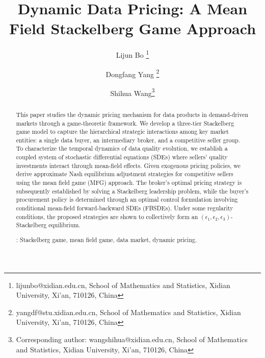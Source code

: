 \documentclass[11pt]{article}
\numberwithin{equation}{section}
\begin{document}
	
	\title{Dynamic Data Pricing: A Mean Field Stackelberg Game Approach}
	
	\author{
		Lijun Bo
		\thanks{lijunbo@xidian.edu.cn, School of Mathematics and Statistics, 
    Xidian University, Xi'an, 710126, China}
		\and
		Dongfang Yang
		\thanks{yangdf@stu.xidian.edu.cn, School of Mathematics and Statistics, 
    Xidian University, Xi'an, 710126, China}
		\and
		Shihua Wang\thanks{Corresponding author: wangshihua@xidian.edu.cn, School of Mathematics and Statistics, Xidian University, Xi'an, 710126, China}	
	}
	
	\date{}
	
	\maketitle
	
	\begin{abstract}
This paper studies the dynamic pricing mechanism for data products in demand-driven markets through a game-theoretic framework. We develop a three-tier Stackelberg game model to capture the hierarchical strategic interactions among key market entities: a single data buyer, an intermediary broker, and a competitive seller group. To characterize the temporal dynamics of data quality evolution, we establish a coupled system of stochastic differential equations (SDEs) where sellers' quality investments interact through mean-field effects. Given exogenous pricing policies, we derive approximate Nash equilibrium adjustment strategies for competitive sellers using the mean field game (MFG) approach. The broker’s optimal pricing strategy is subsequently established by solving a Stackelberg leadership problem, while the buyer’s procurement policy is determined through an optimal control formulation involving conditional mean-field forward-backward SDEs (FBSDEs). Under some regularity conditions, the proposed strategies are shown to collectively form an $(\epsilon_1, \epsilon_2, \epsilon_3)$-Stackelberg equilibrium.
    
	\vspace{0.1in}
	: Stackelberg game, mean field game, data market, dynamic pricing.
	\end{abstract}
	
\end{document}
